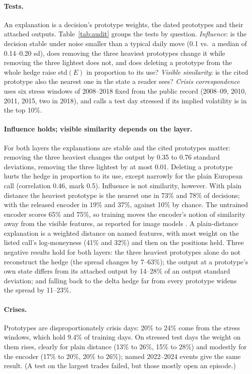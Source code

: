 \documentclass[runningheads]{llncs}
\begin{document}
\paragraph{Tests.} An explanation is a decision's prototype weights, the dated prototypes and their
attached outputs. Table~\ref{tab:audit} groups the tests by question. \emph{Influence}: is the decision
stable under noise smaller than a typical daily move (0.1 vs.\ a median of 0.14--0.20 sd), does removing
the three heaviest prototypes change it while removing the three lightest does not, and does deleting a
prototype from the whole hedge raise std$(E)$ in proportion to its use? \emph{Visible similarity}: is
the cited prototype also the nearest one in the state a reader sees? \emph{Crisis correspondence} uses
six stress windows of 2008--2018 fixed from the public record (2008--09, 2010, 2011,
2015, two in 2018), and calls a test day stressed if its implied volatility is in the top 10\%.

\paragraph{Influence holds; visible similarity depends on the layer.} For both layers the explanations are
stable and the cited prototypes matter: removing the three heaviest changes the output by 0.35 to 0.76
standard deviations, removing the three lightest by at most 0.01. Deleting a prototype hurts the hedge in
proportion to its use, except narrowly for the plain European call (correlation 0.46, mark 0.5). Influence
is not similarity, however. With plain distance the heaviest prototype is the nearest one in 73\% and 78\%
of decisions; with the released encoder in 19\% and 37\%, against 10\% by chance. The untrained encoder
scores 65\% and 75\%, so training moves the encoder's notion of similarity away from the visible features,
as reported for image models \cite{hoffmann2021looks}. A plain-distance explanation is a weighted distance
on named features, with most weight on the listed call's log-moneyness (41\% and 32\%) and then on the
positions held. Three negative results hold for both layers: the three heaviest prototypes alone do not
reconstruct the hedge (the spread changes by 7--63\%); the output at a prototype's own state differs from
its attached output by 14--28\% of an output standard deviation; and falling back to the delta hedge far
from every prototype widens the spread by 11--23\%.

\paragraph{Crises.} Prototypes are disproportionately crisis days: 20\% to 24\% come from the stress
windows, which hold 9.4\% of training days. On stressed test days the weight on them rises, clearly for
plain distance (13\% to 26\%, 15\% to 28\%) and modestly for the encoder (17\% to 20\%, 20\% to 26\%);
named 2022--2024 events give the same result. (A test on the largest trades failed, but those
mostly open an episode.)
\end{document}
